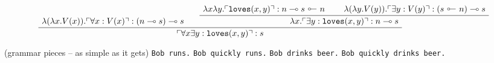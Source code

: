 \begin{example}
\[
\AxiomC{$\lambda (\lambda x . V(x)) . \ulcorner \forall x : V(x) \urcorner : (n \multimap s) \multimap s$}
\AxiomC{$\lambda x \lambda y . \ulcorner \texttt{loves}(x,y) \urcorner : n \multimap s \ \rotatebox[origin=c]{180}{$\multimap$} \ n$}
\AxiomC{$\lambda (\lambda y . V(y)) . \ulcorner \exists y : V(y) \urcorner : (s \ \rotatebox[origin=c]{180}{$\multimap$} \ n) \multimap s$}
\BinaryInfC{$\lambda x . \ulcorner \exists y : \texttt{loves}(x,y) \urcorner : n \multimap s$}
\BinaryInfC{$ \ulcorner \forall x \exists y : \texttt{loves}(x,y) \urcorner : s$}
\DisplayProof
\]

\end{example}

\begin{example}
(grammar pieces -- as simple as it gets)
\texttt{Bob runs.}
\texttt{Bob quickly runs.}
\texttt{Bob drinks beer.}
\texttt{Bob quickly drinks beer.}

\end{example}
